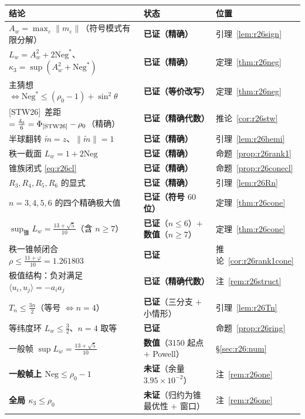 \documentclass[UTF8,11pt]{ctexart}
\theoremstyle{definition}
\newcommand{\STW}{\textup{[STW26]}}
\begin{document}
\begin{center}\small
\begin{tabular}{lll}
\toprule
结论 & 状态 & 位置\\
\midrule
$A_w=\max_\varepsilon\|m_\varepsilon\|$（符号模式有限分解） & \textbf{已证（精确）} & 引理~\ref{lem:r26sign}\\
\textbf{$L_w=A_w^2+2\mathrm{Neg}^*$}、$\kappa_3=\sup(A_w^2+\mathrm{Neg}^*)$ & \textbf{已证（精确）} & 定理~\ref{thm:r26neg}\\
主猜想 $\iff\mathrm{Neg}^*\le(\rho_0-1)+\sin^2\theta$ & \textbf{已证（等价改写）} & 定理~\ref{thm:r26neg}\\
\STW\ 差距 $=\frac{\delta_0}6=\Phi_{\STW}-\rho_0$（精确） & \textbf{已证（精确代数）} & 推论~\ref{cor:r26stw}\\
半球翻转 $\widetilde m=z$、$\|\widetilde m\|=1$ & \textbf{已证（精确）} & 引理~\ref{lem:r26hemi}\\
秩一截面 $L_w=1+2\mathrm{Neg}$ & \textbf{已证（精确）} & 命题~\ref{prop:r26rank1}\\
锥族闭式 \eqref{eq:r26cl} & \textbf{已证（精确）} & 命题~\ref{prop:r26conecl}\\
$R_3,R_4,R_5,R_6$ 的显式 & \textbf{已证（精确）} & 引理~\ref{lem:r26Rn}\\
$n=3,4,5,6$ 的四个精确极大值 & \textbf{已证（符号 $60$ 位）} & 定理~\ref{thm:r26cone}\\
$\sup_{\text{锥}}L_w=\frac{13+\sqrt5}{10}$（含 $n\ge7$） & \textbf{已证}（$n\le6$）$+$\textbf{数值}（$n\ge7$） & 定理~\ref{thm:r26cone}\\
秩一锥帧闭合 $\rho\le\frac{11+\varphi}{10}=1.261803$ & \textbf{已证} & 推论~\ref{cor:r26rank1cone}\\
极值结构：负对满足 $\langle u_i,u_j\rangle=-a_ia_j$ & \textbf{已证（精确代数）} & 注~\ref{rem:r26struct}\\
$T_n\le\frac{3n}2$（等号 $\iff n=4$） & \textbf{已证}（三分支 $+$ 小情形） & 引理~\ref{lem:r26Tn}\\
等纬度环 $L_w\le\frac32$、$n=4$ 取等 & \textbf{已证} & 命题~\ref{prop:r26ring}\\
一般帧 $\sup L_w=\frac{13+\sqrt5}{10}$ & \textbf{数值}（$3150$ 起点 $+$ Powell） & \S\ref{sec:r26:num}\\
\textbf{一般帧上 $\mathrm{Neg}\le\rho_0-1$} & \textbf{未证}（余量 $3.95\times10^{-2}$） & 注~\ref{rem:r26one}\\
\textbf{全局 $\kappa_3\le\rho_0$} & \textbf{未证}（归约为锥最优性 $+$ 窗口） & 注~\ref{rem:r26one}\\
\bottomrule
\end{tabular}
\end{center}
\end{document}
